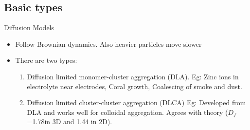 \documentclass{beamer}
\begin{document}

\subsection{Basic types}



\begin{frame}{Diffusion Models}
  \begin{itemize}
  \item {Follow Brownian dynamics. Also heavier particles move slower}
      \item {There are two types: }
      \begin{enumerate}
          \item Diffusion limited monomer-cluster aggregation (DLA). Eg: Zinc ions in electrolyte near electrodes, Coral growth, Coalescing of smoke and dust.  
          \item Diffusion limited cluster-cluster aggregation (DLCA) Eg: Developed from DLA and works well for colloidal aggregation. Agrees with theory (\alert{${D_f}$=1.78}in 3D and 1.44 in 2D).
      \end{enumerate}
 

\end{itemize}
\end{frame}
\end{document}
